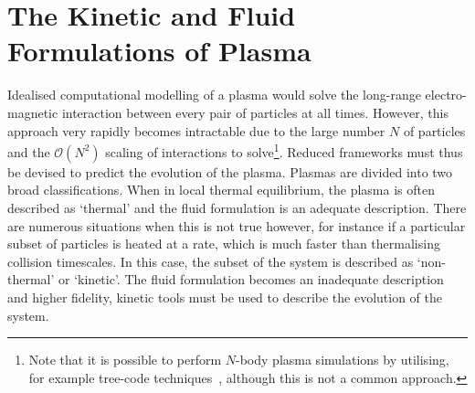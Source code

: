 \section{The Kinetic and Fluid Formulations of Plasma}%
\label{sec:theory_kin_fluid_plasmas}

Idealised computational modelling of a plasma would solve the long-range electro-magnetic interaction between every pair of particles at all times.
However, this approach very rapidly becomes intractable due to the large number $N$ of particles and the $\mathcal{O}(N^2)$ scaling of interactions to solve\footnote{Note that it is possible to perform $N$-body plasma simulations by utilising, for example tree-code techniques~\cite{gibbon_treecode_2004}, although this is not a common approach.}.
Reduced frameworks must thus be devised to predict the evolution of the plasma.
Plasmas are divided into two broad classifications.
When in local thermal equilibrium, the plasma is often described as `thermal' and the fluid formulation is an adequate description.
There are numerous situations when this is not true however, for instance if a particular subset of particles is heated at a rate, which is much faster than thermalising collision timescales.
In this case, the subset of the system is described as `non-thermal' or `kinetic'.
The fluid formulation becomes an inadequate description and higher fidelity, kinetic tools must be used to describe the evolution of the system.

